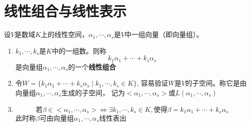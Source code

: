 \section{线性组合与线性表示}
\begin{definition}
    设$V$是数域$K$上的线性空间，$\alpha_1, \cdots, \alpha_s$是$V$中一组向量（即向量组）。
    \begin{enumerate}
        \item $k_1, \cdots, k_s$是$K$中的一组数。则称
        \begin{equation*}
            k_1\alpha_1 + \cdots + k_s\alpha_s
        \end{equation*}
        是向量组$\alpha_1, \cdots, \alpha_s$的一个\textbf{线性组合}

        \item 令$W = \{k_1\alpha_1 + \cdots + k_s\alpha_s \mid k_1, \cdots, k_s \in K\}$,
        容易验证$W$是$V$的子空间。称它是由向量组$\alpha_1, \cdots, \alpha_s$生成的子空间，
        记为$<\alpha_1, \cdots, \alpha_s>$或$L(\alpha_1, \cdots, \alpha_s)$
       
        \item \begin{equation*}
            \text{若}\beta \in <\alpha_1, \cdots, \alpha_s>
            \Leftrightarrow \exists k_1, \cdots, k_s \in K, \text{使得} \beta = k_1\alpha_1 + \cdots + k_s\alpha_s
        \end{equation*}
        此时称$\beta$可由向量组$\alpha_1, \cdots, \alpha_s$线性表出
    \end{enumerate} 
       
\end{definition}

